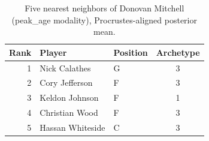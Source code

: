 \begin{table}[htbp]
  \centering\small
  \begin{tabular}{rllc}
    \toprule
    Rank & Player & Position & Archetype \\
    \midrule
    1 & Nick Calathes & G & 3 \\
    2 & Cory Jefferson & F & 3 \\
    3 & Keldon Johnson & F & 1 \\
    4 & Christian Wood & F & 3 \\
    5 & Hassan Whiteside & C & 3 \\
    \bottomrule
  \end{tabular}
  \caption{Five nearest neighbors of Donovan Mitchell (peak_age modality), Procrustes-aligned posterior mean.}
  \label{tab:Donovan_Mitchell_neighbors_peak_age}
\end{table}


